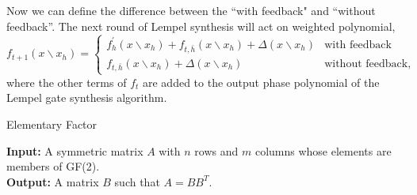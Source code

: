 \documentclass{article}
\theoremstyle{definition}
\theoremstyle{problem}
\theoremstyle{lemma}
\begin{document}
		Now we can define the difference between the ``with feedback" and ``without feedback''. The next round of Lempel synthesis will act on weighted polynomial,
		\begin{equation}
		f_{t+1}(x\backslash x_h) = \left\{\begin{array}{ll}
		f^\prime_h(x\backslash x_h)  + f_{t,\bar{h}}(x\backslash x_h) + \Delta(x\backslash x_h)& \text{with feedback}\\
		f_{t,\bar{h}}(x\backslash x_h) + \Delta(x\backslash x_h)& \text{without feedback},
		\end{array}\right.
		\end{equation}
		where the other terms of $f_t$ are added to the output phase polynomial of the Lempel gate synthesis algorithm.
		
		
		\begin{algorithm}			
			\caption{Elementary Factor}
			\label{alg_elem}
			\textbf{Input:} A symmetric matrix $A$ with $n$ rows and $m$ columns whose elements are members of GF(2).\\
			\textbf{Output:} A matrix $B$ such that $A=BB^T$.
			\begin{algorithmic}[1]
				\EndIf
				\EndFor
				\EndIf
				\EndFor
				\EndProcedure
			\end{algorithmic}
		\end{algorithm}		
		
		
				
\end{document}
